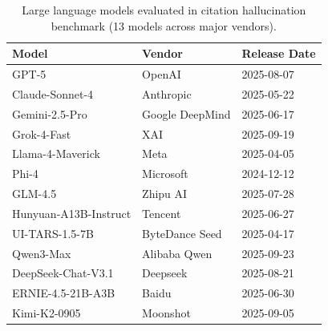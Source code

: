 \begin{table}[t]
  \centering
  \begin{threeparttable}
    \caption{Large language models evaluated in citation hallucination benchmark (13 models across major vendors).}
    \label{tab:models_evaluated}
    \small
{}
\begin{tabular}{lll}
\toprule
\textbf{Model} & \textbf{Vendor} & \textbf{Release Date} \\
\midrule
GPT-5 & OpenAI & 2025-08-07 \\
Claude-Sonnet-4 & Anthropic & 2025-05-22 \\
Gemini-2.5-Pro & Google DeepMind & 2025-06-17 \\
Grok-4-Fast & XAI & 2025-09-19 \\
Llama-4-Maverick & Meta & 2025-04-05 \\
Phi-4 & Microsoft & 2024-12-12 \\
GLM-4.5 & Zhipu AI & 2025-07-28 \\
Hunyuan-A13B-Instruct & Tencent & 2025-06-27 \\
UI-TARS-1.5-7B & ByteDance Seed & 2025-04-17 \\
Qwen3-Max & Alibaba Qwen & 2025-09-23 \\
DeepSeek-Chat-V3.1 & Deepseek & 2025-08-21 \\
ERNIE-4.5-21B-A3B & Baidu & 2025-06-30 \\
Kimi-K2-0905 & Moonshot & 2025-09-05 \\
\bottomrule
\end{tabular}
  \end{threeparttable}
\end{table}

